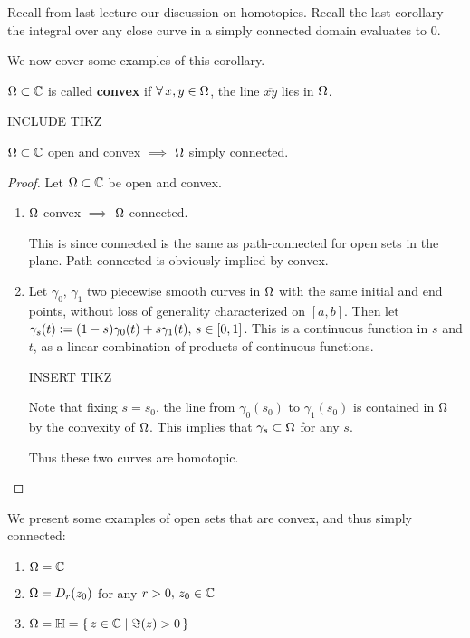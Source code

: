 \setcounter{section}{0}
\setcounter{theorem}{0}


Recall from last lecture our discussion on homotopies. Recall the last corollary -- the integral over any close curve in a simply connected domain evaluates to $0$.

We now cover some examples of this corollary.


\begin{definition}
$\Omega \subset \mathbb{C}$ is called \textbf{convex} if $\forall \, x, y \in \Omega$, the line $\overline{ x y }$ lies in $\Omega$.

INCLUDE TIKZ
\end{definition}


\begin{proposition}
$\Omega \subset \mathbb{C}$ open and convex $\implies$ $\Omega$ simply connected.
\end{proposition}

\begin{proof}
Let $\Omega \subset \mathbb{C}$ be open and convex.
\begin{enumerate}
    \item $\Omega$ convex $\implies$ $\Omega$ connected.
    
    This is since connected is the same as path-connected for open sets in the plane. Path-connected is obviously implied by convex.
    
    \item Let $\gamma_0, \, \gamma_1$ two piecewise smooth curves in $\Omega$ with the same initial and end points, without loss of generality characterized on $[a,b]$. Then let $\gamma_s(t) \vcentcolon = (1-s)\gamma_0(t) + s \gamma_1 (t), \, s \in [0,1]$. This is a continuous function in $s$ and $t$, as a linear combination of products of continuous functions.
    
    INSERT TIKZ
    
    Note that fixing $s= s_0$, the line from $ \gamma_0(s_0)$ to  $\gamma_1(s_0)$ is contained in $\Omega$ by the convexity of $\Omega$. This implies that $\gamma_s \subset \Omega$ for any $s$.
    
    Thus these two curves are homotopic.
    \end{enumerate}
\end{proof}

\begin{example}
We present some examples of open sets that are convex, and thus simply connected:
\begin{enumerate}
    \item $\Omega = \mathbb{C}$
    \item $\Omega = D_r(z_0)$ for any $r>0, \, z_0 \in \mathbb{C}$
    \item $\Omega = \mathbb{H} = \set{ z \in \mathbb{C}\mid \Im (z) >0}$
\end{enumerate}
\end{example}


